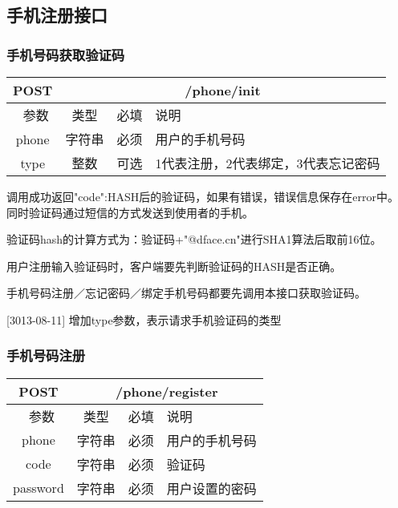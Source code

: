 \subsection{手机注册接口}

\subsubsection{手机号码获取验证码}
\label{hash_algorithm}

\begin{table}[H]
   \begin{center}
\begin{tabular}{|c|c|c|p{12cm}|}
\hline
POST & \multicolumn{3}{|c|}{/phone/init} \\
\hline\hline
 \  参数  & 类型 & 必填 &  说明  \\
\hline
 phone  & 字符串 & 必须 &  用户的手机号码\\
\hline
 type  & 整数 & 可选 &  1代表注册，2代表绑定，3代表忘记密码\\
\hline
\end{tabular}
   \end{center}
\end{table}

调用成功返回{"code":HASH后的验证码}，如果有错误，错误信息保存在error中。
同时验证码通过短信的方式发送到使用者的手机。

验证码hash的计算方式为：验证码+"@dface.cn"进行SHA1算法后取前16位。

用户注册输入验证码时，客户端要先判断验证码的HASH是否正确。

手机号码注册／忘记密码／绑定手机号码都要先调用本接口获取验证码。

[3013-08-11] 增加type参数，表示请求手机验证码的类型

\subsubsection{手机号码注册}
\label{hash_algorithm}

\begin{table}[H]
   \begin{center}
\begin{tabular}{|c|c|c|p{12cm}|}
\hline
POST & \multicolumn{3}{|c|}{/phone/register} \\
\hline\hline
 \  参数  & 类型 & 必填 &  说明  \\
\hline
 phone  & 字符串 & 必须 &  用户的手机号码\\
\hline
 code  & 字符串 & 必须 &  验证码\\
\hline
 password  & 字符串 & 必须 &  用户设置的密码\\
\hline
\end{tabular}
   \end{center}
\end{table}

